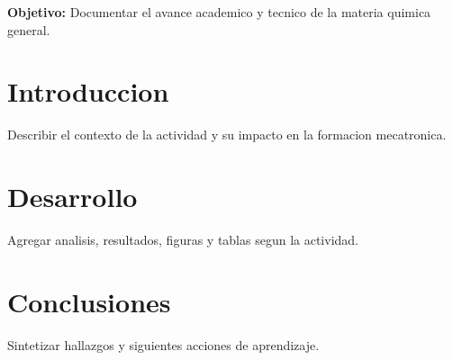 \documentclass[spanish,letterpaper,oneside]{article}
\begin{document}
\templatePortrait
\templatePagecfg
\onehalfspacing

\begin{abstractd}
\textbf{Objetivo:} Documentar el avance academico y tecnico de la materia quimica general.
\end{abstractd}

\templateIndex
\templateFinalcfg

\section{Introduccion}
Describir el contexto de la actividad y su impacto en la formacion mecatronica.

\section{Desarrollo}
Agregar analisis, resultados, figuras y tablas segun la actividad.

\section{Conclusiones}
Sintetizar hallazgos y siguientes acciones de aprendizaje.



\end{document}
